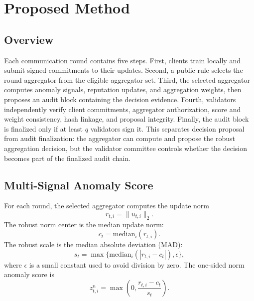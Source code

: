 \documentclass[preprint,authoryear,12pt]{elsarticle}
\begin{document}
\section{Proposed Method}

\subsection{Overview}

Each communication round contains five steps. First, clients train locally and submit signed commitments to their updates. Second, a public rule selects the round aggregator from the eligible aggregator set. Third, the selected aggregator computes anomaly signals, reputation updates, and aggregation weights, then proposes an audit block containing the decision evidence. Fourth, validators independently verify client commitments, aggregator authorization, score and weight consistency, hash linkage, and proposal integrity. Finally, the audit block is finalized only if at least $q$ validators sign it. This separates decision proposal from audit finalization: the aggregator can compute and propose the robust aggregation decision, but the validator committee controls whether the decision becomes part of the finalized audit chain.

\subsection{Multi-Signal Anomaly Score}

For each round, the selected aggregator computes the update norm
\begin{equation}
r_{t,i}=\lVert u_{t,i}\rVert_2.
\end{equation}
The robust norm center is the median update norm:
\begin{equation}
c_t=\mathrm{median}_i(r_{t,i}).
\end{equation}
The robust scale is the median absolute deviation (MAD):
\begin{equation}
s_t=\max\{\mathrm{median}_i(|r_{t,i}-c_t|),\epsilon\},
\end{equation}
where $\epsilon$ is a small constant used to avoid division by zero. The one-sided norm anomaly score is
\begin{equation}
z^n_{t,i}=\max\left(0,\frac{r_{t,i}-c_t}{s_t}\right).
\end{equation}
\end{document}
